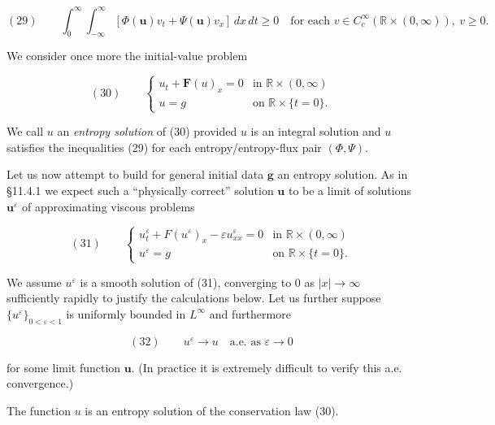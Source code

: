 $$(29) \qquad \int_0^\infty\int_{-\infty}^\infty [\Phi(\mathbf{u})v_t + \Psi(\mathbf{u})v_x]\,dx\,dt \geq 0 \quad \text{for each } v\in C_c^\infty(\mathbb{R}\times(0,\infty)), \ v\geq 0.$$

We consider once more the initial-value problem

$$(30) \qquad \begin{cases} u_t + \mathbf{F}(u)_x = 0 & \text{in } \mathbb{R}\times(0,\infty) \\ u = g & \text{on } \mathbb{R}\times\{t=0\}. \end{cases}$$

\begin{definition}
\label{def:entropy-solution-system}
We call $u$ an \textit{entropy solution} of (30) provided $u$ is an integral solution and $u$ satisfies the inequalities (29) for each entropy/entropy-flux pair $(\Phi,\Psi)$.
\end{definition}

Let us now attempt to build for general initial data $\mathbf{g}$ an entropy solution. As in \S11.4.1 we expect such a ``physically correct'' solution $\mathbf{u}$ to be a limit of solutions $\mathbf{u}^\varepsilon$ of approximating viscous problems

$$(31) \qquad \begin{cases} u^\varepsilon_t + F(u^\varepsilon)_x - \varepsilon u^\varepsilon_{xx} = 0 & \text{in } \mathbb{R}\times(0,\infty) \\ u^\varepsilon = g & \text{on } \mathbb{R}\times\{t=0\}. \end{cases}$$

We assume $u^\varepsilon$ is a smooth solution of (31), converging to 0 as $|x|\to\infty$ sufficiently rapidly to justify the calculations below. Let us further suppose $\{u^\varepsilon\}_{0<\varepsilon<1}$ is uniformly bounded in $L^\infty$ and furthermore

$$(32) \qquad u^\varepsilon \to u \quad \text{a.e. as } \varepsilon\to 0$$

for some limit function $\mathbf{u}$. (In practice it is extremely difficult to verify this a.e. convergence.)

\begin{theorem}
\label{thm:entropy-vanishing-viscosity}
The function $u$ is an entropy solution of the conservation law (30).
\end{theorem}

